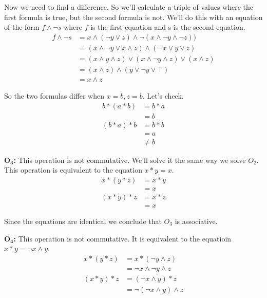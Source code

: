 \documentclass[draft,twoside]{amsart}
\begin{document}
\begin{enumerate}
   Now we need to find a difference. So we'll calculate a triple of
   values where the first formula is true, but the second formula is not.
   We'll do this with an equation of the form $f \land \lnot s$ where $f$
   is the first equation and s is the second equation.
%
   \begin{align*}
      f \land \lnot s & = x \land (\lnot y \lor z) \land \lnot 
                       (x \land \lnot y \land \lnot z))\\
         & = (x \land \lnot y \lor x \land z) \land 
	     (\lnot x \lor y \lor z) \\
	 & = (x \land y \land z) \lor (x \land \lnot y \land z) 
	      \lor (x \land z) \\
	 & = (x \land z) \land (y \lor \lnot y \lor \top) \\
	 & = x \land z
   \end{align*}

   So the two formulas differ when $x = b, z = b$. Let's check.
%
   \begin{align*}
       b * (a * b) & = b * a \\
                   & = b \\
       (b * a) * b & = b * b \\
                   & = a     \\
		   & \ne b
   \end{align*}

   $\mathbf{O_3}$\textbf{:} This operation is not commutative. We'll solve
   it the same way we solve ${O_2}$. This operation is equivalent to the 
   equation $x*y=x$.
%
   \begin{align*}
      x * (y * z) & = x * y \\
                  & = x     \\
      (x * y) * z & = x * z \\
                  & = x
   \end{align*}

   Since the equations are identical we conclude that $O_3$ is associative.

   $\mathbf{O_4}$\textbf{:} This operation is not commutative. It is 
   equivalent to the equatioin $x * y = \lnot x \land y$.
%
   \begin{align*}
      x * (y * z) & = x * (\lnot y \land z)    \\
                  & = \lnot x \land \lnot y \land z \\
      (x * y) * z & = (\lnot x \land y) * z \\
                  & = \lnot (\lnot x \land y) \land z
   \end{align*}


\end{enumerate}
\end{document}
